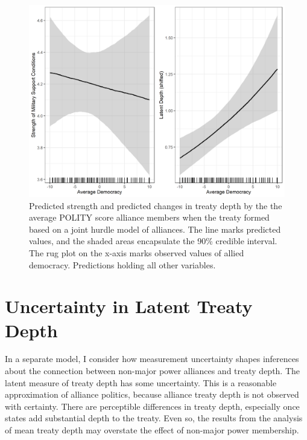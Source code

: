 \documentclass[12pt]{article}
\begin{document}
\begin{figure}
\includegraphics[width=.95\textwidth]{results-joint-hurdle.png}  
\caption{Predicted strength and predicted changes in treaty depth by the the average POLITY score alliance members when the treaty formed based on a joint hurdle model of alliances. The line marks predicted values, and the shaded areas encapsulate the 90\% credible interval. The rug plot on the x-axis marks observed values of allied democracy. Predictions holding all other variables.}
\label{fig:results-joint-hurdle}
\end{figure}





\section{Uncertainty in Latent Treaty Depth} 


In a separate model, I consider how measurement uncertainty shapes inferences about the connection between non-major power alliances and treaty depth. 
The latent measure of treaty depth has some uncertainty. 
This is a reasonable approximation of alliance politics, because alliance treaty depth is not observed with certainty. 
There are perceptible differences in treaty depth, especially once states add substantial depth to the treaty. 
Even so, the results from the analysis of mean treaty depth may overstate the effect of non-major power membership. 
\end{document}
